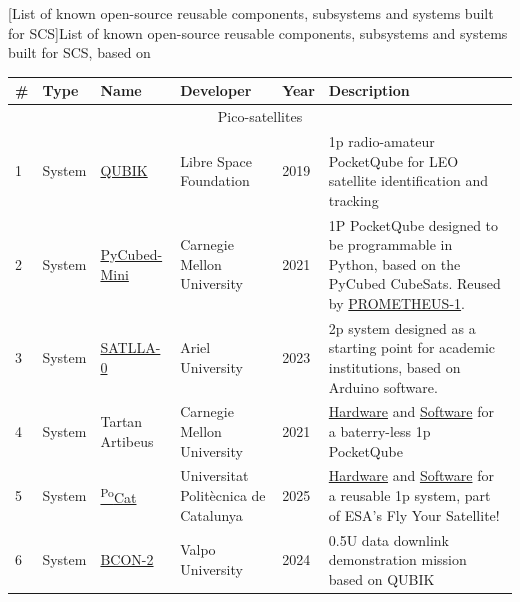 \documentclass[a4paper,nobib,justified,final]{tufte-book}
\begin{document}
\FloatBarrier\newpage
\begin{landscape}
	[List of known open-source reusable components, subsystems and systems built for SCS]{List of known open-source reusable components, subsystems and systems built for \acl{SCS}, based on \cite{albaorbitalBeginnersGuideOpen2025}}%
	\begin{tabularx}{.95\linewidth}{@{}lllll>{\small}X@{}}
		\toprule
		\textbf{\#} & \textbf{Type} & \textbf{Name} & \textbf{Developer} & \textbf{Year} & \textbf{Description} \\ \midrule
		\multicolumn{6}{c}{Pico-satellites} \\ \midrule

		1 & System & \href{https://gitlab.com/librespacefoundation/qubik/}{QUBIK} & Libre Space Foundation & 2019 & 1p radio-amateur PocketQube for \acs{LEO} satellite identification and tracking \\

		2 & System & \href{https://github.com/PyCubed-Mini}{PyCubed-Mini} & Carnegie Mellon University & 2021 & 1P PocketQube designed to be programmable in Python, based on the PyCubed CubeSats. Reused by \href{https://github.com/AFS-pt/PROMETHEUS-1}{PROMETHEUS-1}. \\

		
		3 & System & \href{https://github.com/kcglab/satllazero}{SATLLA-0} & Ariel University & 2023 & 2p system designed as a starting point for academic institutions, based on Arduino software. \\

		4 & System & Tartan Artibeus & Carnegie Mellon University & 2021 & \href{https://github.com/CMUAbstract/tartan-artibeus-hw}{Hardware} and \href{https://github.com/CMUAbstract/tartan-artibeus-hw}{Software} for a baterry-less 1p PocketQube \\

		5 & System & \href{https://wiki.nanosatlab.space/shelves/ieee-open-pocketqube-kit-mFR}{\textsuperscript{Po}Cat} & Universitat Polit\`{e}cnica de Catalunya & 2025 & \href{https://github.com/nanosatlab/pocat-hw}{Hardware} and \href{https://github.com/nanosatlab/pocat-lektron-sw}{Software} for a reusable 1p system, part of \acs{ESA}'s Fly Your Satellite! \\
		6 & System & \href{https://gitlab.com/wiredlab/space/bcon-2}{BCON-2} & Valpo University & 2024 & 0.5U data downlink demonstration mission based on QUBIK \\


\end{tabularx}
\end{landscape}
\end{document}
